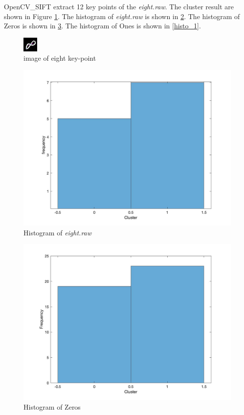 \documentclass[11pt]{article}
\begin{document}
OpenCV\_SIFT extract 12 key points of the {\it eight.raw}. The cluster result are shown in Figure \ref{eight_kp}. The histogram of {\it eight.raw} is shown in \ref{histogram_bow}. The histogram of Zeros is shown in \ref{histo_0}. The histogram of Ones is shown in \ref{histo_1}.
\begin{figure}[!htp]
	\centering
	\includegraphics[scale=5]{eight_kp.png}
	\caption{ image of eight key-point}
	\label{eight_kp}
	\end{figure}
\begin{figure}[!htp]
	\centering
	\includegraphics[scale=0.3]{histogram_bow.jpg}
	\caption{ Histogram of {\it eight.raw}}
	\label{histogram_bow}
	\end{figure}
	
\begin{figure}[!htp]
	\centering
	\includegraphics[scale=0.3]{histo_0.jpg}
	\caption{ Histogram of Zeros}
	\label{histo_0}
	\end{figure}
	
\end{document}

